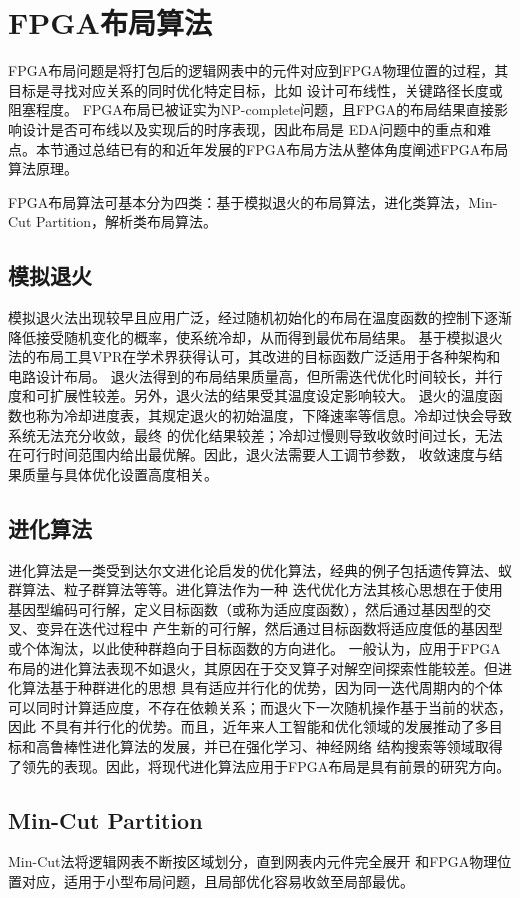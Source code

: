 \section{FPGA布局算法}

FPGA布局问题是将打包后的逻辑网表中的元件对应到FPGA物理位置的过程，其目标是寻找对应关系的同时优化特定目标，比如
设计可布线性，关键路径长度或阻塞程度。
FPGA布局已被证实为NP-complete问题，且FPGA的布局结果直接影响设计是否可布线以及实现后的时序表现，因此布局是
EDA问题中的重点和难点。本节通过总结已有的和近年发展的FPGA布局方法从整体角度阐述FPGA布局算法原理。


FPGA布局算法可基本分为四类：基于模拟退火的布局算法，进化类算法，Min-Cut Partition，解析类布局算法。

\subsection{模拟退火}
模拟退火法出现较早且应用广泛，经过随机初始化的布局在温度函数的控制下逐渐降低接受随机变化的概率，使系统冷却，从而得到最优布局结果。
基于模拟退火法的布局工具VPR在学术界获得认可，其改进的目标函数广泛适用于各种架构和电路设计布局。
退火法得到的布局结果质量高，但所需迭代优化时间较长，并行度和可扩展性较差。另外，退火法的结果受其温度设定影响较大。
退火的温度函数也称为冷却进度表，其规定退火的初始温度，下降速率等信息。冷却过快会导致系统无法充分收敛，最终
的优化结果较差；冷却过慢则导致收敛时间过长，无法在可行时间范围内给出最优解。因此，退火法需要人工调节参数，
收敛速度与结果质量与具体优化设置高度相关。


\subsection{进化算法}
进化算法是一类受到达尔文进化论启发的优化算法，经典的例子包括遗传算法、蚁群算法、粒子群算法等等。进化算法作为一种
迭代优化方法其核心思想在于使用基因型编码可行解，定义目标函数（或称为适应度函数），然后通过基因型的交叉、变异在迭代过程中
产生新的可行解，然后通过目标函数将适应度低的基因型或个体淘汰，以此使种群趋向于目标函数的方向进化。
一般认为，应用于FPGA布局的进化算法表现不如退火，其原因在于交叉算子对解空间探索性能较差。但进化算法基于种群进化的思想
具有适应并行化的优势，因为同一迭代周期内的个体可以同时计算适应度，不存在依赖关系；而退火下一次随机操作基于当前的状态，因此
不具有并行化的优势。而且，近年来人工智能和优化领域的发展推动了多目标和高鲁棒性进化算法的发展，并已在强化学习、神经网络
结构搜索等领域取得了领先的表现。因此，将现代进化算法应用于FPGA布局是具有前景的研究方向。

\subsection{Min-Cut Partition}
Min-Cut法将逻辑网表不断按区域划分，直到网表内元件完全展开
和FPGA物理位置对应，适用于小型布局问题，且局部优化容易收敛至局部最优。

